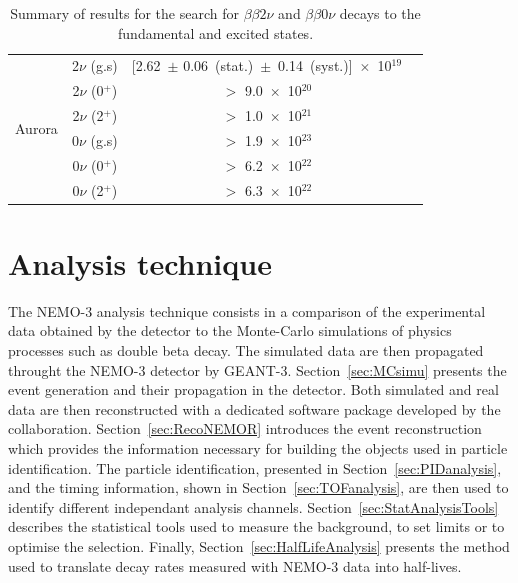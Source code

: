 \documentclass[main.tex]{subfiles}
\begin{document}
\begin{table}[h!]
\begin{center}
\begin{tabular}{c|c|c|c}
\hline

\multirow{6}{*}{Aurora} & 2$\nu$ (g.s) & [2.62~$\pm$ 0.06~(stat.)~$\pm$~0.14~(syst.)]~$\times$~10$^{\text{19}}$& \multirow{6}{*}{\cite{Aurora}}\\[0.1cm]
                        & 2$\nu$ (0$^+$) & $>$ 9.0~$\times$~10$^{\text{20}}$&\\[0.1cm]
                        & 2$\nu$ (2$^+$) & $>$ 1.0~$\times$~10$^{\text{21}}$&\\[0.1cm]
                        & 0$\nu$ (g.s)   & $>$ 1.9~$\times$~10$^{\text{23}}$&\\[0.1cm]
                        & 0$\nu$ (0$^+$) & $>$ 6.2~$\times$~10$^{\text{22}}$&\\[0.1cm]
                        & 0$\nu$ (2$^+$) & $>$ 6.3~$\times$~10$^{\text{22}}$&\\[0.1cm]
\bottomrule
\end{tabular}
\caption{Summary of results for the search for $\beta \beta 2\nu$ and $\beta \beta 0\nu$ decays to the fundamental and excited states.}
\label{TableSummaryResultsFS}
\end{center}
\end{table}


\FloatBarrier

\clearpage

\section{Analysis technique}\label{sec:AnalysisTechnique}


\NI The NEMO-3 analysis technique consists in a comparison of the experimental data obtained by the detector to the Monte-Carlo simulations of physics processes such as double beta decay. The simulated data are then propagated throught the NEMO-3 detector by GEANT-3. Section~\ref{sec:MCsimu} presents the event generation and their propagation in the detector. Both simulated and real data are then reconstructed with a dedicated software package developed by the collaboration. Section~\ref{sec:RecoNEMOR} introduces the event reconstruction which provides the information necessary for building the objects used in particle identification. The particle identification, presented in Section~\ref{sec:PIDanalysis}, and the timing information, shown in Section~\ref{sec:TOFanalysis}, are then used to identify different independant analysis channels. Section~\ref{sec:StatAnalysisTools} describes the statistical tools used to measure the background, to set limits or to optimise the selection. Finally, Section~\ref{sec:HalfLifeAnalysis} presents the method used to translate decay rates measured with NEMO-3 data into half-lives.
\end{document}
